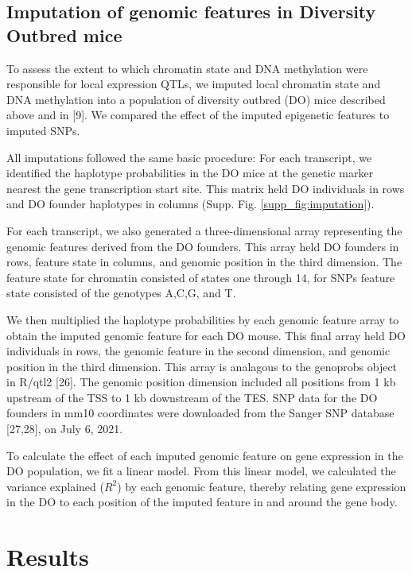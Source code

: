\documentclass[10pt,letterpaper]{article}
\begin{document}
\hypertarget{imputation-of-genomic-features-in-diversity-outbred-mice}{%
\subsection{Imputation of genomic features in Diversity Outbred
mice}\label{imputation-of-genomic-features-in-diversity-outbred-mice}}

To assess the extent to which chromatin state and DNA methylation were
responsible for local expression QTLs, we imputed local chromatin state
and DNA methylation into a population of diversity outbred (DO) mice
described above and in {[}9{]}. We compared the effect of the imputed
epigenetic features to imputed SNPs.

All imputations followed the same basic procedure: For each transcript,
we identified the haplotype probabilities in the DO mice at the genetic
marker nearest the gene transcription start site. This matrix held DO
individuals in rows and DO founder haplotypes in columns (Supp. Fig.
\ref{supp_fig:imputation}).

For each transcript, we also generated a three-dimensional array
representing the genomic features derived from the DO founders. This
array held DO founders in rows, feature state in columns, and genomic
position in the third dimension. The feature state for chromatin
consisted of states one through 14, for SNPs feature state consisted of
the genotypes A,C,G, and T.

We then multiplied the haplotype probabilities by each genomic feature
array to obtain the imputed genomic feature for each DO mouse. This
final array held DO individuals in rows, the genomic feature in the
second dimension, and genomic position in the third dimension. This
array is analagous to the genoprobs object in R/qtl2 {[}26{]}. The
genomic position dimension included all positions from 1 kb upstream of
the TSS to 1 kb downstream of the TES. SNP data for the DO founders in
mm10 coordinates were downloaded from the Sanger SNP database
{[}27,28{]}, on July 6, 2021.

To calculate the effect of each imputed genomic feature on gene
expression in the DO population, we fit a linear model. From this linear
model, we calculated the variance explained (\(R^2\)) by each genomic
feature, thereby relating gene expression in the DO to each position of
the imputed feature in and around the gene body.

\hypertarget{results}{%
\section{Results}\label{results}}
\end{document}
